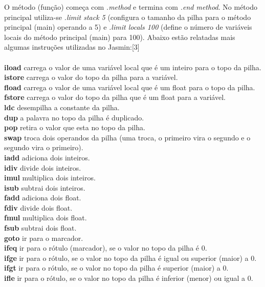 \documentclass[12pt,a4paper,twoside]{report}
\begin{document}
 O método (função) começa com  \textit{ .method} e termina com   \textit{ .end
method}. No método principal utiliza-se \textit{ .limit stack 5}
 (configura o tamanho da pilha para o método
principal (main) operando a 5) e  \textit{ .limit locals 100}
 (define o número de variáveis locais do método
principal (main) para 100).
Abaixo estão relatadas mais algumas instruções utilizadas no Jasmin:[3]\\ \\
 \textbf{iload} carrega o valor de uma variável local que é um inteiro para o topo da pilha.\\
 \textbf{istore} carrega o valor do topo da pilha para a variável.\\
 \textbf{fload} carrega o valor de uma variável local que é um float para o topo da pilha.\\
 \textbf{fstore} carrega o valor do topo da pilha que é um float para a variável.\\
 \textbf{ldc} desempilha a constante da pilha.\\
 \textbf{dup} a palavra no topo da pilha é duplicado.\\
 \textbf{pop} retira o valor que esta no topo da pilha.\\
 \textbf{swap} troca dois operandos da pilha (uma troca, o primeiro vira o segundo e o segundo vira o primeiro).\\
 \textbf{iadd} adiciona dois inteiros.\\
 \textbf{idiv} divide dois inteiros.\\
 \textbf{imul}  multiplica dois inteiros.\\
 \textbf{isub} subtrai dois inteiros.\\
 \textbf{fadd} adiciona dois float.\\
 \textbf{fdiv} divide dois float.\\
 \textbf{fmul} multiplica dois float.\\
 \textbf{fsub} subtrai dois float.\\
 \textbf{goto}  ir para o marcador.\\
 \textbf{ifeq} ir para o rótulo (marcador), se o valor no topo da pilha é 0.\\
 \textbf{ifge} ir para o rótulo, se o valor no topo da pilha é igual ou superior (maior) a 0.\\
 \textbf{ifgt} ir para o rótulo, se o valor no topo da pilha é superior (maior) a 0.\\
 \textbf{ifle} ir para o rótulo, se o valor no topo da pilha é inferior (menor) ou igual a 0.\\
\end{document}
